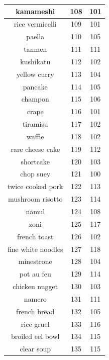 {\begin{longtable}{| c | c | c|}
        \hline
        kamameshi  &  108  &  101  \\
        \hline
        rice vermicelli  &  109  &  101  \\
        \hline
        paella  &  110  &  105  \\
        \hline
        tanmen  &  111  &  111  \\
        \hline
        kushikatu  &  112  &  102  \\
        \hline
        yellow curry  &  113  &  104  \\
        \hline
        pancake  &  114  &  105  \\
        \hline
        champon  &  115  &  106  \\
        \hline
        crape  &  116  &  101  \\
        \hline
        tiramisu  &  117  &  102  \\
        \hline
        waffle  &  118  &  102  \\
        \hline
        rare cheese cake  &  119  &  112  \\
        \hline
        shortcake  &  120  &  103  \\
        \hline
        chop suey  &  121  &  100  \\
        \hline
        twice cooked pork  &  122  &  113  \\
        \hline
        mushroom risotto  &  123  &  114  \\
        \hline
        namul  &  124  &  108  \\
        \hline
        zoni  &  125  &  117  \\
        \hline
        french toast  &  126  &  102  \\
        \hline
        fine white noodles  &  127  &  118  \\
        \hline
        minestrone  &  128  &  104  \\
        \hline
        pot au feu  &  129  &  114  \\
        \hline
        chicken nugget  &  130  &  103  \\
        \hline
        namero  &  131  &  111  \\
        \hline
        french bread  &  132  &  105  \\
        \hline
        rice gruel  &  133  &  116  \\
        \hline
        broiled eel bowl  &  134  &  115  \\
        \hline
        clear soup  &  135  &  115  \\

\end{longtable}}

